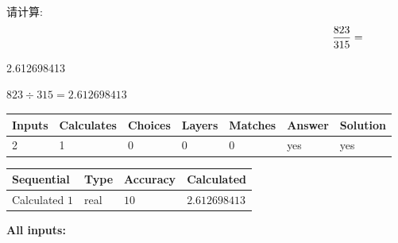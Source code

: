 \documentclass{ctexart}
\begin{document}
  
 
请计算:
\begin{equation}
\frac { %
823 }  {  %
315} = \nonumber
\end{equation}
 
 
 
\noindent{}
 
 

2.612698413
 
 
\noindent{}
 
 

 
 
 
\noindent{}
 
 

$ %
823 \div  %
315=   %
2.612698413$
 
 
\noindent{}
 
 

 
   
   
   
   
\noindent\begin{tabular}{|l|l|l|l|l|l|l|}
 \hline
Inputs & Calculates & Choices & Layers & Matches & Answer & Solution \\ \hline
 2  & 
 1  & 
 0
  & 
 0  & 
 0  & 
  yes & 
  yes 
  \\ \hline
 \end{tabular}
   
   
   
   
\noindent{}
   
   
  
  
\noindent\begin{tabular}{|l|l|l|l|}
\hline
 Sequential & Type & Accuracy & Calculated \\ 
\hline
 
 
  Calculated $  1 $ & real & $  10  $ & 
 $ 2.612698413 $ 
 \\  \hline  
 \end{tabular}
   
   
   
   
\noindent\vspace{0.1in}\hspace{-0.08in} {\textbf{\Large{All inputs: }}}
   
\end{document}

